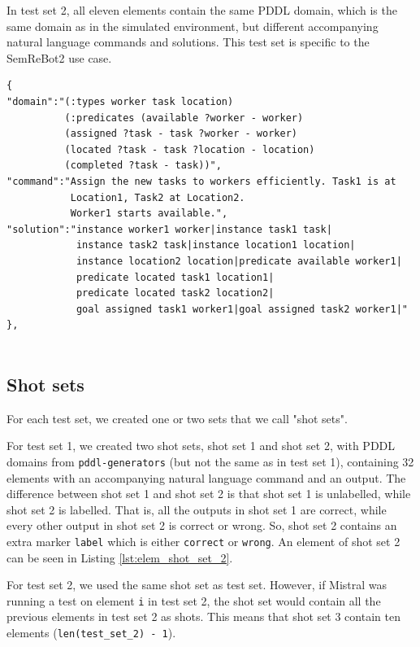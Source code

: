 In test set 2, all eleven elements contain the same PDDL domain, which is the same domain as in the simulated environment, but different accompanying natural language commands and solutions. This test set is specific to the SemReBot2 use case.

\begin{lstlisting}[caption={An element of test set 1 showing the domain and command Mistral is given. The output is to measure if Mistral is correct or wrong.}, label=lst:elem_test_set_1]
{
"domain":"(:types worker task location)
          (:predicates (available ?worker - worker)
          (assigned ?task - task ?worker - worker)
          (located ?task - task ?location - location)
          (completed ?task - task))",
"command":"Assign the new tasks to workers efficiently. Task1 is at
           Location1, Task2 at Location2.
           Worker1 starts available.",
"solution":"instance worker1 worker|instance task1 task|
            instance task2 task|instance location1 location|
            instance location2 location|predicate available worker1|
            predicate located task1 location1|
            predicate located task2 location2|
            goal assigned task1 worker1|goal assigned task2 worker1|"
},
           
\end{lstlisting}

\subsection{Shot sets}
For each test set, we created one or two sets that we call "shot sets".

For test set 1, we created two shot sets, shot set 1 and shot set 2, with PDDL domains from \verb|pddl-generators| (but not the same as in test set 1), containing 32 elements with an accompanying natural language command and an output. The difference between shot set 1 and shot set 2 is that shot set 1 is unlabelled, while shot set 2 is labelled. That is, all the outputs in shot set 1 are correct, while every other output in shot set 2 is correct or wrong. So, shot set 2 contains an extra marker \verb|label| which is either \verb|correct| or \verb|wrong|. An element of shot set 2 can be seen in Listing \ref{lst:elem_shot_set_2}.

For test set 2, we used the same shot set as test set. However, if Mistral was running a test on element \verb|i| in test set 2, the shot set would contain all the previous elements in test set 2 as shots. This means that shot set 3 contain ten elements (\verb|len(test_set_2) - 1|).

